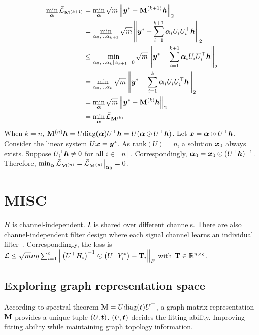 \documentclass{article} %
\def\valpha{{\bm\alpha}}
\begin{document}
\begin{equation}
	\begin{aligned}
		\min_{\valpha}\bar\gL_{\rmM^{(k+1)}}&=\min_{\valpha}\sqrt{m}\left\|\vy^*-\rmM^{(k+1)}\vh\right\|_2\\
		&=\min_{\alpha_0,\dots\alpha_{k+1}}\sqrt{m}\left\|\vy^*-\sum_{i=1}^{k+1}\valpha_iU_iU_i^{\top}\vh\right\|_2\\
		&\leq\min_{\alpha_0,\dots\alpha_k|\alpha_{k+1}=0}\sqrt{m}\left\|\vy^*-\sum_{i=1}^{k+1}\valpha_iU_iU_i^{\top}\vh\right\|_2\\
		&=\min_{\alpha_0,\dots\alpha_k}\sqrt{m}\left\|\vy^*-\sum_{i=1}^k\valpha_iU_iU_i^{\top}\vh\right\|_2\\
		&=\min_{\valpha}\sqrt{m}\left\|\vy^*-\rmM^{(k)}\vh\right\|_2\\
		&=\min_{\valpha}\bar\gL_{\rmM^{(k)}}
	\end{aligned}
\end{equation}
When $k=n$, $\rmM^{(n)}\vh=U\mathrm{diag}(\valpha)U^{\top}\vh=U(\valpha\odot U^{\top}\vh)$.
Let $\vx=\valpha\odot U^{\top}\vh$.
Consider the linear system $U{\bm{x}}={\bm{y}}^*$.
As $\mathrm{rank}(U)=n$, a solution ${\bm{x}}_0$ always exists.
Suppose $U_i^{\top}{\bm{h}}\neq0$ for all $i\in[n]$.
Correspondingly, $\valpha_0=\vx_0\odot(U^{\top}\vh)^{-1}$.
Therefore, $\min_{\valpha}\bar\gL_{\rmM^{(n)}}=\bar\gL_{\rmM^{(n)}}\big|_{\valpha_0}=0$.


\newpage

\section{MISC}

$H$ is channel-independent.
${\bm{t}}$ is shared over different channels.
There are also channel-independent filter design where each signal channel learns an individual filter~\citep{yang2022spectrum,JacobiConv,bo2022specformer}.
Correspondingly, the loss is ${\mathcal{L}}\leq\sqrt{m}n\eta\sum_{i=1}^c\left\|\left(U^{\top}H_i\right)^{-1}\odot\left(U^{\top}Y^*_i\right)-{\mathbf{T}}_i\right\|_F$ with ${\mathbf{T}}\in{\mathbb{R}}^{n\times c}$.

\subsection{Exploring graph representation space}
According to spectral theorem ${\mathbf{M}}=U\mathrm{diag}({\bm{t}})U^{\top}$, a graph matrix representation ${\mathbf{M}}$ provides a unique tuple $(U,{\bm{t}})$.
$(U,{\bm{t}})$ decides the fitting ability.
Improving fitting ability while maintaining graph topology information.
\end{document}
